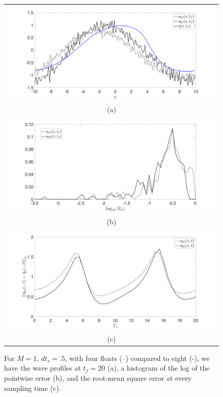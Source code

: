 \begin{figure}
	\centering
	\begin{tabular}{c}
		\includegraphics[width=.95\textwidth]{Images/wave_tf_20_sig_pt1_4_vs8floats_Mval_1} \\
		(a)\\
		\includegraphics[width=.95\textwidth]{Images/histogram_tf_20_sig_pt1_4_vs_8floats_Mval_1}\\
		(b)\\
		\includegraphics[width=.95\textwidth]{Images/rmserr_tf_20_sig_pt1_4_vs8floats_Mval_1}\\
		(c)
	\end{tabular}
	\caption{For $M=1$, $dt_{s}=.5$, with four floats (--) compared to eight (-), we have the wave profiles at $t_{f}=20$ (a), a histogram of the log of the pointwise error (b), and the root-mean square error at every sampling time (c).} 
	\label{fig:Mval_1}
\end{figure}

